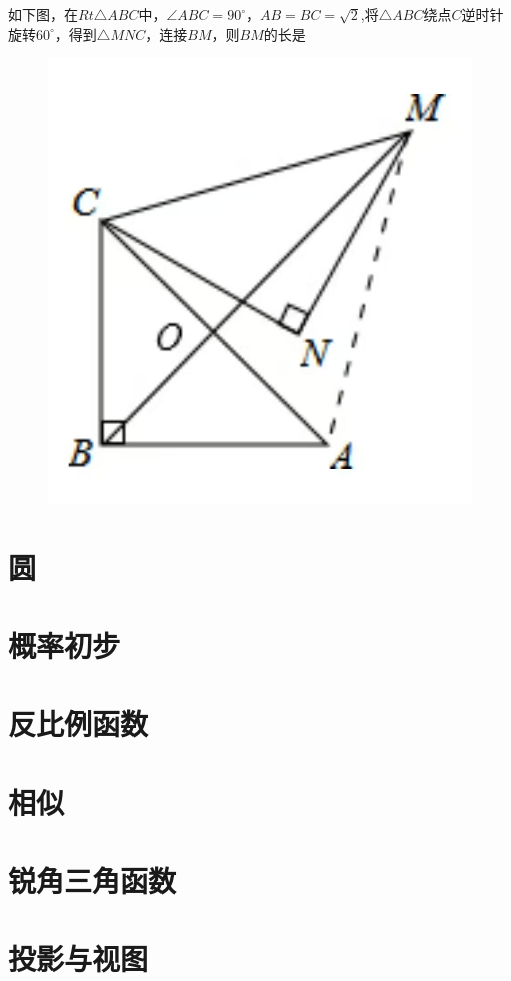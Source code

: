 \documentclass[lang=cn, 10pt, titlestyle=hang, oneside]{elegantbook}
\begin{document}
\begin{example}
    如下图，在\(Rt\triangle ABC \)中，\(\angle ABC = 90^\circ \)，\(AB=BC=\sqrt{2}\),将\(\triangle ABC\)绕点\(C\)逆时针旋转\(60^\circ\)，得到\(\triangle MNC\)，连接\(BM\)，则\(BM\)的长是 \underline{\hspace{3em}}
    
\begin{figure}[h]
    \raggedright
    \includegraphics[width=0.25\linewidth]{figure/example_rotation1.jpg}
    
    \label{fig:enter-label}
\end{figure}
    
\end{example}



\chapter{圆}

\chapter{概率初步}

\chapter{反比例函数}

\chapter{相似}

\chapter{锐角三角函数}

\chapter{投影与视图}
\end{document}
